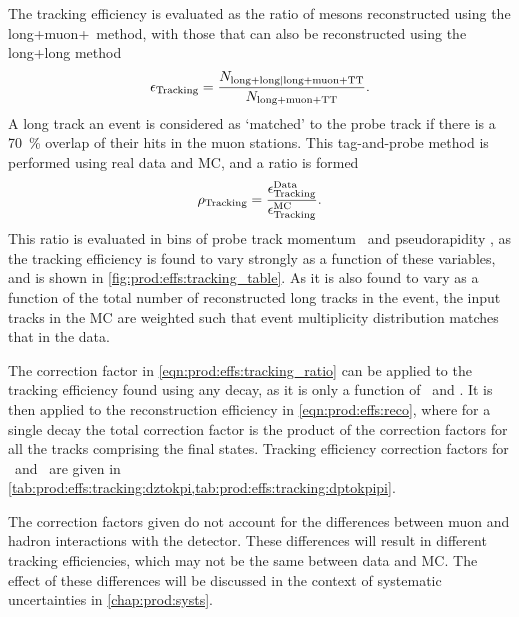 The tracking efficiency is evaluated as the ratio of \PJpsi mesons 
reconstructed using the long+muon+\ttracker\ method, with those that can also 
be reconstructed using the long+long method
\begin{equation}
  \eff_{\text{Tracking}} = 
  \frac{%
    N_{\text{long+long|long+muon+TT}}
  }{%
    N_{\text{long+muon+TT}}
  }.
  \label{eqn:prod:effs:tracking_eff}
\end{equation}
A long track an event is considered as `matched' to the probe track if there is 
a \SI{70}{\percent} overlap of their hits in the muon stations.
This tag-and-probe method is performed using real data and \ac{MC}, and a ratio 
is formed
\begin{equation}
  \efftracking = \frac{%
    \eff_{\text{Tracking}}^{\text{Data}}
  }{%
    \eff_{\text{Tracking}}^{\text{MC}}
  }.
  \label{eqn:prod:effs:tracking_ratio}
\end{equation}
This ratio is evaluated in bins of probe track momentum \ptot\ and 
pseudorapidity \Eta, as the tracking efficiency is found to vary strongly as a 
function of these variables, and is shown in 
\cref{fig:prod:effs:tracking_table}.
As it is also found to vary as a function of the total number of reconstructed 
long tracks in the event, the input tracks in the \ac{MC} are weighted such 
that event multiplicity distribution matches that in the data.

The correction factor in \cref{eqn:prod:effs:tracking_ratio} can be applied to 
the tracking efficiency found using any decay, as it is only a function of 
\ptot\ and \Eta.
It is then applied to the reconstruction efficiency in 
\cref{eqn:prod:effs:reco}, where for a single decay the total correction factor 
is the product of the correction factors for all the tracks comprising the 
final states.
Tracking efficiency correction factors for \DzToKpi\ and \DpToKpipi\ are given 
in \cref{tab:prod:effs:tracking:dztokpi,tab:prod:effs:tracking:dptokpipi}.

The correction factors given do not account for the differences between muon 
and hadron interactions with the detector.
These differences will result in different tracking efficiencies, which may not 
be the same between data and \ac{MC}.
The effect of these differences will be discussed in the context of systematic 
uncertainties in \cref{chap:prod:systs}.

